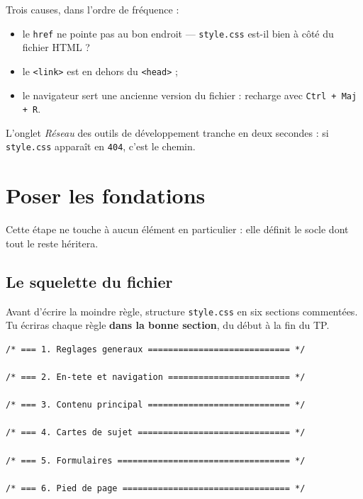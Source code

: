 \documentclass[a4paper,11pt]{article}
\begin{document}
\begin{tcolorbox}[attention, title={Si rien ne change}]
Trois causes, dans l'ordre de fréquence :
\begin{itemize}
  \item le \texttt{href} ne pointe pas au bon endroit --- \texttt{style.css} est-il bien à côté du fichier HTML ?
  \item le \texttt{<link>} est en dehors du \texttt{<head>} ;
  \item le navigateur sert une ancienne version du fichier : recharge avec \texttt{Ctrl + Maj + R}.
\end{itemize}
L'onglet \textit{Réseau} des outils de développement tranche en deux secondes : si \texttt{style.css} apparaît en \texttt{404}, c'est le chemin.
\end{tcolorbox}

\section{Poser les fondations}

Cette étape ne touche à aucun élément en particulier : elle définit le socle dont tout le reste héritera.

\subsection{Le squelette du fichier}

Avant d'écrire la moindre règle, structure \texttt{style.css} en six sections commentées. Tu écriras chaque règle \textbf{dans la bonne section}, du début à la fin du TP.

\begin{lstlisting}[language=CSS3, caption={À placer tel quel en tête de \texttt{style.css}}]
/* === 1. Reglages generaux ============================ */

/* === 2. En-tete et navigation ======================== */

/* === 3. Contenu principal ============================ */

/* === 4. Cartes de sujet ============================== */

/* === 5. Formulaires ================================== */

/* === 6. Pied de page ================================= */
\end{lstlisting}
\end{document}

